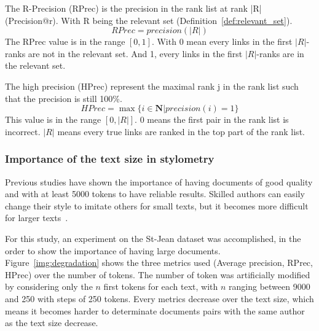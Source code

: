 \begin{definition}
  The R-Precision (RPrec) is the precision in the rank list at rank |R| (Precision@r).
  With R being the relevant set (Definition~\ref{def:relevant_set}).
  \begin{equation}
    RPrec = precision(|R|)
  \end{equation}
  The RPrec value is in the range $\left[0, 1\right]$.
  With 0 mean every links in the first $|R|$-ranks are not in the relevant set.
  And 1, every links in the first $|R|$-ranks are in the relevant set.
\end{definition}

\begin{definition}
  The high precision (HPrec) represent the maximal rank j in the rank list such that the precision is still 100\%.
  \begin{equation}
    HPrec = \max\{i \in \mathbf{N} | precision(i) = 1\}
  \end{equation}
  This value is in the range $\left[0, |R|\right]$.
  $0$ means the first pair in the rank list is incorrect.
  $|R|$ means every true links are ranked in the top part of the rank list.
\end{definition}

\subsubsection{Importance of the text size in stylometry}

Previous studies have shown the importance of having documents of good quality and with at least 5000 tokens to have reliable results.
Skilled authors can easily change their style to imitate others for small texts, but it becomes more difficult for larger texts~\cite{savoy_stylo}.

For this study, an experiment on the St-Jean dataset was accomplished, in the order to show the importance of having large documents.
Figure~\ref{img:degradation} shows the three metrics used (Average precision, RPrec, HPrec) over the number of tokens.
The number of token was artificially modified by considering only the $n$ first tokens for each text, with $n$ ranging between 9000 and 250 with steps of 250 tokens.
Every metrics decrease over the text size, which means it becomes harder to determinate documents pairs with the same author as the text size decrease.

